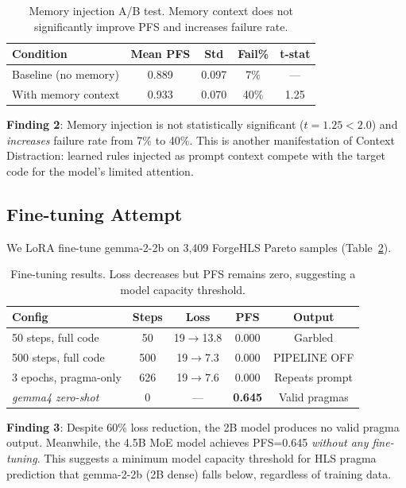 \documentclass[conference]{IEEEtran}
\begin{document}
\begin{table}[t]
\centering
\caption{Memory injection A/B test. Memory context does not
significantly improve PFS and increases failure rate.}
\label{tab:memory}
\begin{tabular}{lcccc}
\toprule
\textbf{Condition} & \textbf{Mean PFS} & \textbf{Std} & \textbf{Fail\%} & \textbf{t-stat} \\
\midrule
Baseline (no memory)  & 0.889 & 0.097 & 7\%  & --- \\
With memory context   & 0.933 & 0.070 & 40\% & 1.25 \\
\bottomrule
\end{tabular}
\end{table}

\textbf{Finding 2}: Memory injection is not statistically significant
($t=1.25 < 2.0$) and \emph{increases} failure rate from 7\% to 40\%.
This is another manifestation of Context Distraction: learned rules
injected as prompt context compete with the target code for the
model's limited attention.

\subsection{Fine-tuning Attempt}

We LoRA fine-tune gemma-2-2b on 3,409 ForgeHLS Pareto samples
(Table~\ref{tab:finetune}).

\begin{table}[t]
\centering
\caption{Fine-tuning results. Loss decreases but PFS remains zero,
suggesting a model capacity threshold.}
\label{tab:finetune}
\begin{tabular}{lcccc}
\toprule
\textbf{Config} & \textbf{Steps} & \textbf{Loss} & \textbf{PFS} & \textbf{Output} \\
\midrule
50 steps, full code    & 50   & 19$\to$13.8 & 0.000 & Garbled \\
500 steps, full code   & 500  & 19$\to$7.3  & 0.000 & PIPELINE OFF \\
3 epochs, pragma-only  & 626  & 19$\to$7.6  & 0.000 & Repeats prompt \\
\midrule
\emph{gemma4 zero-shot} & 0   & ---         & \textbf{0.645} & Valid pragmas \\
\bottomrule
\end{tabular}
\end{table}

\textbf{Finding 3}: Despite 60\% loss reduction, the 2B model
produces no valid pragma output. Meanwhile, the 4.5B MoE model
achieves PFS=0.645 \emph{without any fine-tuning}. This suggests
a minimum model capacity threshold for HLS pragma prediction that
gemma-2-2b (2B dense) falls below, regardless of training data.
\end{document}
